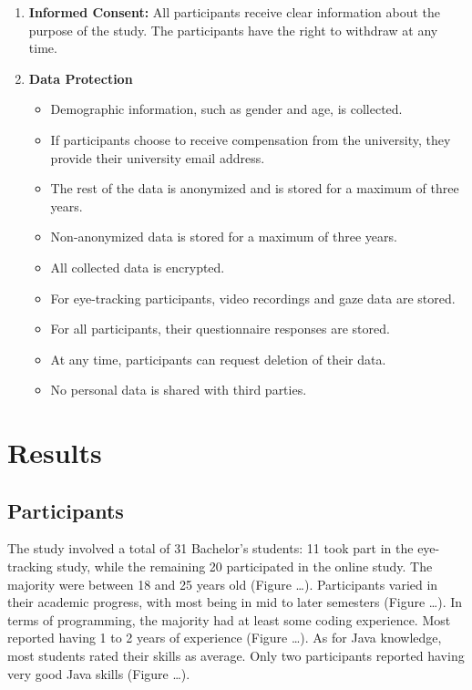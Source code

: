 \begin{enumerate}
    \item \textbf{Informed Consent: }All participants receive clear information about the purpose of the study. The participants have the right to withdraw at any time.
    
    \item \textbf{Data Protection}
    \begin{itemize}
        \item Demographic information, such as gender and age, is collected.
        \item If participants choose to receive compensation from the university, they provide their university email address.
        \item The rest of the data is anonymized and is stored for a maximum of three years.
        \item Non-anonymized data is stored for a maximum of three years.
        \item All collected data is encrypted.
        \item For eye-tracking participants, video recordings and gaze data are stored.
        \item For all participants, their questionnaire responses are stored.
        \item At any time, participants can request deletion of their data.
        \item No personal data is shared with third parties.
    \end{itemize}
\end{enumerate}

\chapter{Results}

\section{Participants}

The study involved a total of 31 Bachelor’s students: 11 took part in the eye-tracking study, while the remaining 20 participated in the online study. The majority were between 18 and 25 years old (Figure …).
Participants varied in their academic progress, with most being in mid to later semesters (Figure …).
In terms of programming, the majority had at least some coding experience. Most reported having 1 to 2 years of experience (Figure …).
As for Java knowledge, most students rated their skills as average. Only two participants reported having very good Java skills (Figure …).


